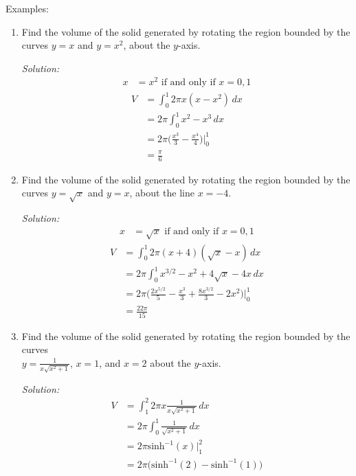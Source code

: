 \documentclass[16pt]{article}
\theoremstyle{remark}
\begin{document}
Examples:
\begin{enumerate}
\item Find the volume of the solid generated by rotating the region bounded by the curves $y=x$ and $y=x^2$, about the $y$-axis.
\begin{mdframed}[style=TheoremFrame]
\textit{Solution:}
\begin{align*}
x&=x^2 \text{ if and only if } x=0,1
\end{align*}
\begin{align*}
V&= \int_0^1 2 \pi x (x-x^2) \, dx\\
&= 2 \pi \int_0^1 x^2 - x^3 \, dx\\
&= 2 \pi \bigg(\frac{x^3}{3} - \frac{x^4}{4}\bigg) \bigg|_0^1\\
&= \frac{\pi}{6}
\end{align*}
\end{mdframed}
\item Find the volume of the solid generated by rotating the region bounded by the curves $y=\sqrt{x}$ and $y=x$, about the line $x=-4$.
\begin{mdframed}[style=TheoremFrame]
\textit{Solution:}
\begin{align*}
x&=\sqrt{x} \text{ if and only if } x=0,1
\end{align*}
\begin{align*}
V&= \int_0^1 2 \pi (x+4) (\sqrt{x}-x) \, dx\\
&= 2 \pi \int_0^1 x^{3/2} - x^2 + 4 \sqrt{x} - 4x \, dx\\
&= 2 \pi \bigg(\frac{2x^{5/2}}{5} - \frac{x^3}{3} + \frac{8x^{3/2}}{3}-2x^2\bigg) \bigg|_0^1\\
&= \frac{22\pi}{15}
\end{align*}
\end{mdframed}
\item Find the volume of the solid generated by rotating the region bounded by the curves\\ $\displaystyle{y=\frac{1}{x\sqrt{x^2+1}}}$, $x=1$, and $x=2$ about the $y$-axis.
\begin{mdframed}[style=TheoremFrame]
\textit{Solution:}
\begin{align*}
V&= \int_1^2 2 \pi x \frac{1}{x\sqrt{x^2+1}} \, dx\\
&= 2\pi \int_0^1 \frac{1}{\sqrt{x^2+1}} \, dx \\
&= 2\pi \text{sinh}^{-1}(x) \bigg|_1^2\\
&= 2\pi \big(\text{sinh}^{-1}(2)-\text{sinh}^{-1}(1)\big)
\end{align*}
\end{mdframed}


\end{enumerate}
\end{document}
